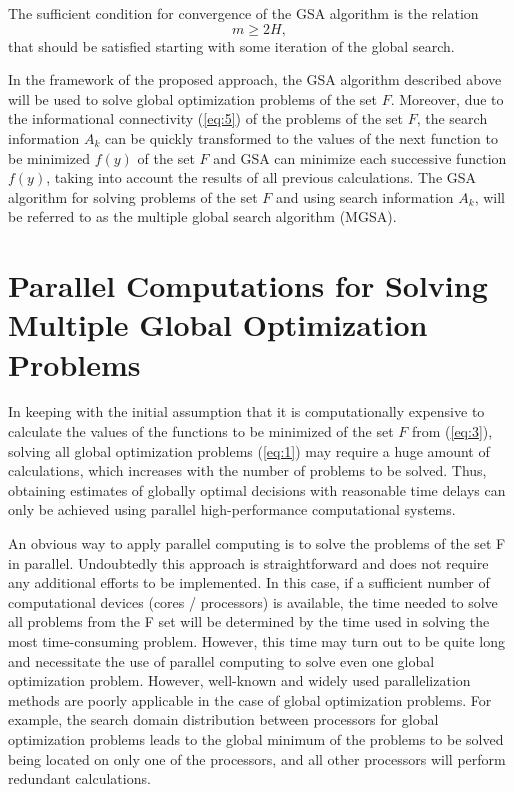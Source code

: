 \documentclass[review]{elsarticle}
\begin{document}
The sufficient condition for convergence of the GSA algorithm is the relation
\begin{equation}\label{eq:24}
m \geq 2H,
\end{equation}
that should be satisfied starting with some iteration of the global search. 

In the framework of the proposed approach, the GSA algorithm described above will be used to solve global optimization problems of the set $F$. Moreover, due to the informational connectivity (\ref{eq:5}) of the problems of the set $F$, the search information $A_k$ can be quickly transformed to the values of the next function to be minimized $f(y)$ of the set $F$ and GSA can minimize each successive function $f(y)$, taking into account the results of all previous calculations. The GSA algorithm for solving problems of the set $F$ and using search information $A_k$, will be referred to as the multiple global search algorithm (MGSA).


\section{Parallel Computations for Solving Multiple Global Optimization Problems}\label{sec:4}

In keeping with the initial assumption that it is computationally expensive to calculate the values of the functions to be minimized of the set $F$ from (\ref{eq:3}), solving all global optimization problems (\ref{eq:1}) may require a huge amount of calculations, which increases with the number of problems to be solved. Thus, obtaining estimates of globally optimal decisions with reasonable time delays can only be achieved using parallel high-performance computational systems. 

An obvious way to apply parallel computing is to solve the problems of the set F in parallel. Undoubtedly this approach is straightforward and does not require any additional efforts to be  implemented. In this case, if a sufficient number of computational devices (cores / processors) is available, the time needed to solve all problems from the F set will be determined by the time used in solving the most time-consuming problem. However, this time may turn out to be quite long and necessitate the use of parallel computing to solve even one global optimization problem. However, well-known and widely used parallelization methods are poorly applicable in the case of global optimization problems. For example, the search domain distribution between processors for global optimization problems leads to the global minimum of the problems to be solved being located on only one of the processors, and all other processors will perform redundant calculations.
\end{document}
